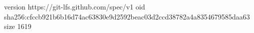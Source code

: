 version https://git-lfs.github.com/spec/v1
oid sha256:cfccb921b6b16d74ac63830e9d2592beac03d2ccd38782a4a8354679585daa63
size 1619
